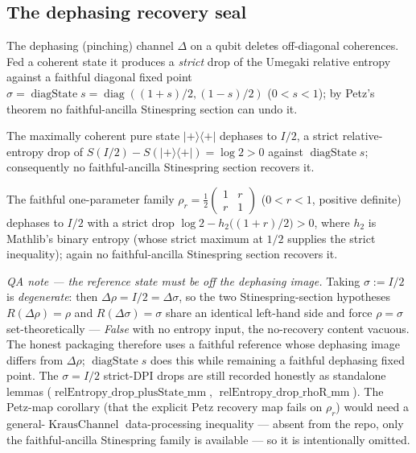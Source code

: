 \subsection{The dephasing recovery seal}

The dephasing (pinching) channel \(\Delta\) on a qubit deletes off-diagonal coherences. Fed a
coherent state it produces a \emph{strict} drop of the Umegaki relative entropy against a faithful
diagonal fixed point \(\sigma = \operatorname{diagState} s = \operatorname{diag}((1+s)/2, (1-s)/2)\)
(\(0 < s < 1\)); by Petz's theorem no faithful-ancilla Stinespring section can undo it.

\begin{theorem}\label{quantum_seal_dephase}
  \leanok
  The maximally coherent pure state \(|{+}\rangle\langle{+}|\) dephases to \(I/2\), a strict
  relative-entropy drop of \(S(I/2) - S(|{+}\rangle\langle{+}|) = \log 2 > 0\) against
  \(\operatorname{diagState} s\); consequently no faithful-ancilla Stinespring section recovers it.
\end{theorem}

\begin{theorem}\label{quantum_seal_dephase_faithful}
  \leanok
  The faithful one-parameter family \(\rho_r = \tfrac12\!\left(\begin{smallmatrix}1 & r\\ r &
  1\end{smallmatrix}\right)\) (\(0 < r < 1\), positive definite) dephases to \(I/2\) with a strict
  drop \(\log 2 - h_2\!\big((1+r)/2\big) > 0\), where \(h_2\) is Mathlib's binary entropy (whose
  strict maximum at \(1/2\) supplies the strict inequality); again no faithful-ancilla Stinespring
  section recovers it.
\end{theorem}

\emph{QA note --- the reference state must be off the dephasing image.} Taking \(\sigma := I/2\) is
\emph{degenerate}: then \(\Delta\rho = I/2 = \Delta\sigma\), so the two Stinespring-section
hypotheses \(R(\Delta\rho) = \rho\) and \(R(\Delta\sigma) = \sigma\) share an identical left-hand
side and force \(\rho = \sigma\) set-theoretically --- \emph{False} with no entropy input, the
no-recovery content vacuous. The honest packaging therefore uses a faithful reference whose dephasing
image differs from \(\Delta\rho\); \(\operatorname{diagState} s\) does this while remaining a faithful
dephasing fixed point. The \(\sigma = I/2\) strict-DPI drops are still recorded honestly as
standalone lemmas (\(\operatorname{relEntropy\_drop\_plusState\_mm}\),
\(\operatorname{relEntropy\_drop\_rhoR\_mm}\)). The Petz-map corollary (that the explicit Petz
recovery map fails on \(\rho_r\)) would need a general-\(\operatorname{KrausChannel}\) data-processing
inequality --- absent from the repo, only the faithful-ancilla Stinespring family is available --- so
it is intentionally omitted.

